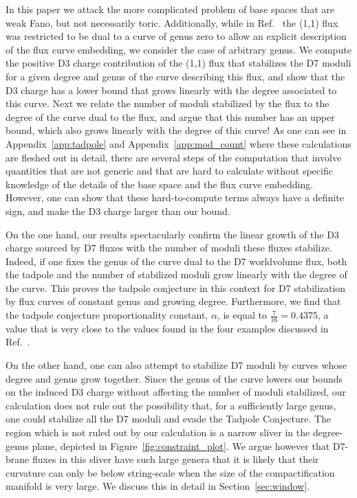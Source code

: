 \documentclass[a4paper,12pt]{article}
\numberwithin{equation}{section}
\begin{document}
In this paper we attack the more complicated problem of base spaces that are weak Fano, but not necessarily toric. Additionally, while in Ref.~\cite{Collinucci:2008pf} the (1,1) flux was restricted to be dual to a curve of genus zero to allow an explicit description of the flux curve embedding, we consider the case of arbitrary genus. We compute the positive D3 charge contribution of the (1,1) flux that stabilizes the D7 moduli for a given degree and genus of the curve describing this flux, and show that the D3 charge has a lower bound that grows linearly with the degree associated to this curve. Next we relate the number of moduli stabilized by the flux to the degree of the curve dual to the flux, and argue that this number has an upper bound, which also grows linearly with the degree of this curve! As one can see in Appendix~\ref{app:tadpole} and Appendix~\ref{app:mod_count} where these calculations are fleshed out in detail, there are several steps of the computation that involve quantities that are not generic and that are hard to calculate without specific knowledge of the details of the base space and the flux curve embedding. However, one can show that these hard-to-compute terms always have a definite sign, and make the D3 charge larger than our bound.

On the one hand, our results spectacularly confirm the linear growth of the D3 charge sourced by D7 fluxes with the number of moduli these fluxes stabilize. Indeed, if one fixes the genus of the curve dual to the D7 worldvolume flux, both the tadpole and the number of stabilized moduli grow linearly with the degree of the curve. This proves the tadpole conjecture in this context for D7 stabilization by flux curves of constant genus and growing degree. Furthermore, we find that the tadpole conjecture proportionality constant, $\alpha$, is equal to $\frac{7}{16} = 0.4375$, a value that is very close to the values found in the four examples discussed in Ref.~\cite{Bena:2020xrh}.  


On the other hand, one can also attempt to stabilize D7 moduli by curves whose degree and genus grow together. Since the genus of the curve lowers our bounds on the induced D3 charge without affecting the number of moduli stabilized, our calculation does not rule out the possibility that, for a sufficiently large genus, one could stabilize all the D7 moduli and evade the Tadpole Conjecture. The region which is not ruled out by our calculation is a narrow sliver in the degree-genus plane, depicted in Figure~\ref{fig:constraint_plot}. We argue however that D7-brane fluxes in this sliver have such large genera that it is likely that their curvature can only be below string-scale when the size of the compactification manifold is very large. We discuss this in detail in Section~\ref{sec:window}.
\end{document}
